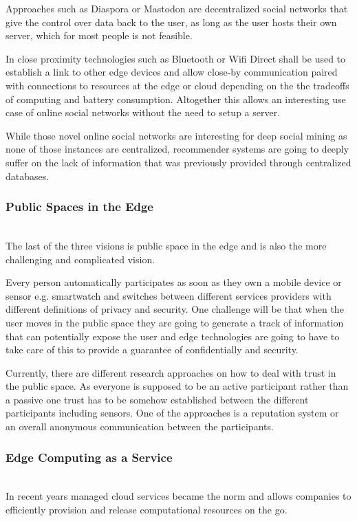 Approaches such as Diaspora or Mastodon are decentralized social networks that give the control over data back to the user, as long as the user hosts their own server, which for most people is not feasible.

In close proximity technologies such as Bluetooth or Wifi Direct shall be used to establish a link to other edge devices and allow close-by communication paired with connections to resources at the edge or cloud depending on the the tradeoffs of computing and battery consumption. Altogether this allows an interesting use case of online social networks without the need to setup a server.

While those novel online social networks are interesting for deep social mining as none of those instances are centralized, recommender systems are going to deeply suffer on the lack of information that was previously provided through centralized databases.

\subsubsection{Public Spaces in the Edge}\hspace*{\fill} \\
The last of the three visions is public space in the edge and is also the more challenging and complicated vision.

Every person automatically participates as soon as they own a mobile device or sensor e.g. smartwatch and switches between different services providers with different definitions of privacy and security.
One challenge will be that when the user moves in the public space they are going to generate a track of information that can potentially expose the user and edge technologies are going to have to take care of this to provide a guarantee of confidentially and security.

Currently, there are different research approaches on how to deal with trust in the public space. As everyone is supposed to be an active participant rather than a passive one trust has to be somehow established between the different participants including sensors.
One of the approaches is a reputation system or an overall anonymous communication between the participants.

\subsubsection{Edge Computing as a Service}\hspace*{\fill} \\
In recent years managed cloud services became the norm and allows companies to efficiently provision and release computational resources on the go.

